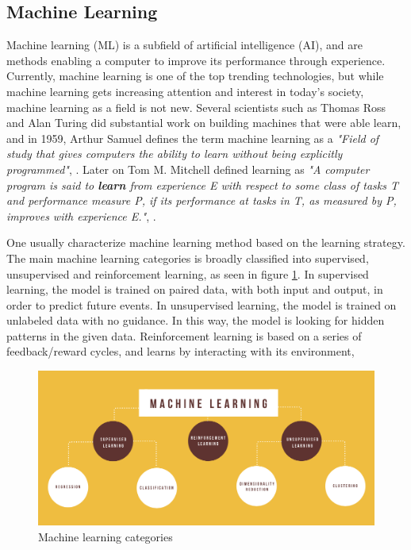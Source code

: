 \subsection{Machine Learning}
\label{sec:ML}

Machine learning (ML) is a subfield of artificial intelligence (AI), and are methods enabling a computer to improve its performance through experience. Currently, machine learning is one of the top trending technologies, but while machine learning gets increasing attention and interest in today's society, machine learning as a field is not new. Several scientists such as Thomas Ross and Alan Turing did substantial work on building machines that were able learn, and in 1959, Arthur Samuel defines the term machine learning as a \emph{"Field of study that gives computers the ability to learn without being explicitly programmed"}, \citep{ML_def}. Later on Tom M. Mitchell defined learning as \emph{"A computer program is said to \textbf{learn} from experience E with respect to some class of tasks T and performance measure P, if its performance at tasks in T, as measured by P, improves with experience E."}, \citep{Mitchell}.

One usually characterize machine learning method based on the learning strategy. The main machine learning categories is broadly classified into supervised, unsupervised and reinforcement learning, as seen in figure \ref{fig:ML_kategorier}. In supervised learning, the model is trained on paired data, with both input and output, in order to predict future events. In unsupervised learning, the model is trained on unlabeled data with no guidance. In this way, the model is looking for hidden patterns in the given data. Reinforcement learning is based on a series of feedback/reward cycles, and learns by interacting with its environment, \citep{Definitions}

\begin{figure}[h!]
\centering
\includegraphics[scale=0.45]{Images/1_introduction/ML_kategorier.png}
\caption{Machine learning categories}
\label{fig:ML_kategorier}
\end{figure}

